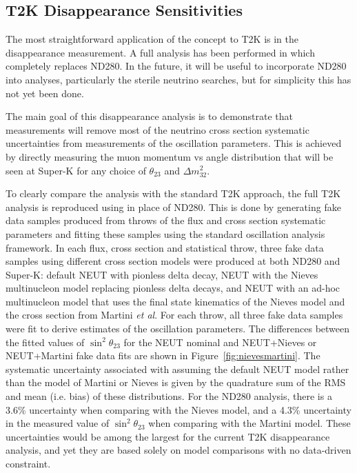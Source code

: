 \subsection{T2K \numu Disappearance Sensitivities}
\label{sec:disap}

The most straightforward application of the \nuprism concept to T2K is in the \numu disappearance measurement. A full \numu analysis has been performed in which \nuprismlite completely replaces ND280. In the future, it will be useful to incorporate ND280 into \nuprismlite analyses, particularly the sterile neutrino searches, but for simplicity this has not yet been done.

The main goal of this \numu disappearance analysis is to demonstrate that \nuprismlite measurements will remove most of the neutrino cross section systematic uncertainties from measurements of the oscillation parameters. This is achieved by directly measuring the muon momentum vs angle distribution that will be seen at Super-K for any choice of $\theta_{23}$ and $\Delta m^2_{32}$.

To clearly compare the \nuprismlite \numu analysis with the standard T2K approach, the full T2K analysis is reproduced using \nuprismlite in place of ND280. This is done by generating fake data samples produced from throws of the flux and cross section systematic parameters and fitting these samples using the standard oscillation analysis framework. In each flux, cross section and statistical throw, three fake data samples using different cross section models were produced at both ND280 and Super-K: default NEUT with pionless delta decay, NEUT with the Nieves multinucleon model replacing pionless delta decays, and NEUT with an ad-hoc multinucleon model that uses the final state kinematics of the Nieves model and the cross section from Martini {\it et al}.
For each throw, all three fake data samples were fit to derive estimates of the oscillation parameters.  The differences between the fitted values of  $\sin^2\theta_{23}$ for the NEUT nominal and NEUT+Nieves or NEUT+Martini fake data fits are shown in Figure~\ref{fig:nievesmartini}.
The systematic uncertainty associated with assuming the default NEUT model rather than the model of Martini or Nieves is given by the quadrature sum of the RMS and mean (i.e. bias) of these distributions. For the ND280 analysis, there is a 3.6\% uncertainty when comparing with the Nieves model, and a 4.3\% uncertainty in the measured value of $\sin^2\theta_{23}$ when comparing with the Martini model. These uncertainties would be among the largest for the current T2K \numu disappearance analysis, and yet they are based solely on model comparisons with no data-driven constraint.

